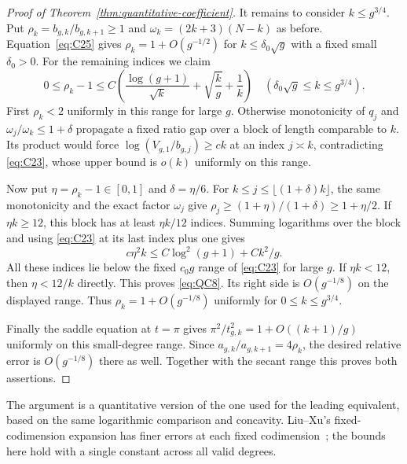 \begin{proof}[Proof of Theorem~\ref{thm:quantitative-coefficient}]
It remains to consider $k\le g^{3/4}$. Put
$\rho_k=b_{g,k}/b_{g,k+1}\ge1$ and
$\omega_k=(2k+3)(N-k)$ as before. Equation~\eqref{eq:C25} gives
$\rho_k=1+O(g^{-1/2})$ for $k\le\delta_0\sqrt g$ with a fixed
small $\delta_0>0$. For the remaining indices we claim
\begin{equation}
 0\le\rho_k-1\le C\left(
       \frac{\log(g+1)}{\sqrt k}+\sqrt{\frac kg}+\frac1k\right)
 \quad(\delta_0\sqrt g\le k\le g^{3/4}).
 \label{eq:QC8}
\end{equation}
First $\rho_k<2$ uniformly in this range for large $g$. Otherwise
monotonicity of $q_j$ and $\omega_j/\omega_k\le1+\delta$ propagate a fixed
ratio gap over a block of length comparable to $k$. Its product
would force $\log(V_{g,1}/b_{g,j})\ge c k$ at an index $j\asymp k$,
contradicting \eqref{eq:C23}, whose upper bound is $o(k)$ uniformly
on this range.

Now put $\eta=\rho_k-1\in[0,1]$ and $\delta=\eta/6$.
For $k\le j\le\lfloor(1+\delta)k\rfloor$, the same monotonicity
and the exact factor $\omega_j$ give
$\rho_j\ge(1+\eta)/(1+\delta)\ge1+\eta/2$.
If $\eta k\ge12$, this block has at least $\eta k/12$ indices.
Summing logarithms over the block and using \eqref{eq:C23} at its
last index plus one gives
\[
 c\eta^2 k\le C\log^2(g+1)+Ck^2/g.
\]
All these indices lie below the fixed $c_0g$ range of \eqref{eq:C23}
for large $g$. If $\eta k<12$, then $\eta<12/k$ directly.
This proves \eqref{eq:QC8}. Its right side is $O(g^{-1/8})$ on
the displayed range. Thus $\rho_k=1+O(g^{-1/8})$ uniformly for
$0\le k\le g^{3/4}$.

Finally the saddle equation at $t=\pi$ gives
$\pi^2/t_{g,k}^2=1+O((k+1)/g)$ uniformly on this small-degree
range. Since $a_{g,k}/a_{g,k+1}=4\rho_k$, the desired
relative error is $O(g^{-1/8})$ there as well. Together with the
secant range this proves both assertions.
\end{proof}

The argument is a quantitative version of the one used for the leading
equivalent, based on the same logarithmic comparison and concavity. Liu--Xu's fixed-codimension expansion
has finer errors at each fixed codimension~\cite{LX}; the bounds here
hold with a single constant across all valid degrees.
